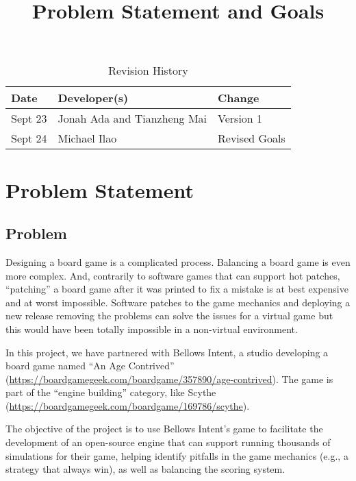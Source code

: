 \documentclass{article}
\title{Problem Statement and Goals\\\progname}
\author{\authname}
\date{}
\begin{document}
\maketitle

\begin{table}[hp]
\caption{Revision History} \label{TblRevisionHistory}
\begin{tabularx}{\textwidth}{llX}
\toprule
\textbf{Date} & \textbf{Developer(s)} & \textbf{Change}\\
\midrule
Sept 23 & Jonah Ada and Tianzheng Mai & Version 1\\
\midrule
Sept 24 & Michael Ilao & Revised Goals\\
\bottomrule
\end{tabularx}
\end{table}

\section{Problem Statement}



\subsection{Problem}
\indent Designing a board game is a complicated process.
Balancing a board game is even more complex. And, contrarily to software games
that can support hot patches, ``patching'' a board game after it was printed to
fix a mistake is at best expensive and at worst impossible.
Software patches to the game mechanics and deploying a new release removing the problems can solve the issues for a virtual game but this would have been totally impossible in a
non-virtual environment.


In this project, we have partnered with Bellows Intent, a studio developing a
board game named ``An Age Contrived''
(\url{https://boardgamegeek.com/boardgame/357890/age-contrived}). The game is
part of the ``engine building'' category, like Scythe
(\url{https://boardgamegeek.com/boardgame/169786/scythe}). 

The objective of the project is to use Bellows Intent's game to facilitate the development of an open-source engine that can support running thousands of simulations for their game, helping identify
pitfalls in the game mechanics (e.g., a strategy that always win), as well as
balancing the scoring system. 
\end{document}
